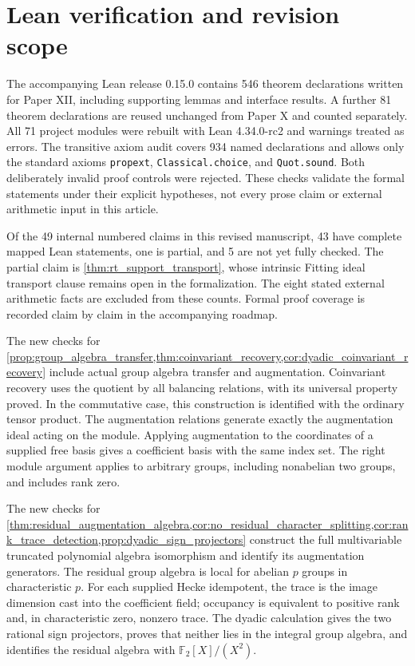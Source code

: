 \documentclass[11pt]{amsart}
\theoremstyle{definition}
\theoremstyle{remark}
\newcommand{\FF}{\mathbb F}
\begin{document}
\section*{Lean verification and revision scope}

The accompanying Lean release 0.15.0 contains 546 theorem declarations written for Paper XII, including supporting lemmas and interface results. A further 81 theorem declarations are reused unchanged from Paper X and counted separately. All 71 project modules were rebuilt with Lean 4.34.0-rc2 and warnings treated as errors. The transitive axiom audit covers 934 named declarations and allows only the standard axioms \texttt{propext}, \texttt{Classical.choice}, and \texttt{Quot.sound}. Both deliberately invalid proof controls were rejected. These checks validate the formal statements under their explicit hypotheses, not every prose claim or external arithmetic input in this article.

Of the 49 internal numbered claims in this revised manuscript, 43 have complete mapped Lean statements, one is partial, and 5 are not yet fully checked. The partial claim is \cref{thm:rt_support_transport}, whose intrinsic Fitting ideal transport clause remains open in the formalization. The eight stated external arithmetic facts are excluded from these counts. Formal proof coverage is recorded claim by claim in the accompanying roadmap.

The new checks for \cref{prop:group_algebra_transfer,thm:coinvariant_recovery,cor:dyadic_coinvariant_recovery} include actual group algebra transfer and augmentation. Coinvariant recovery uses the quotient by all balancing relations, with its universal property proved. In the commutative case, this construction is identified with the ordinary tensor product. The augmentation relations generate exactly the augmentation ideal acting on the module. Applying augmentation to the coordinates of a supplied free basis gives a coefficient basis with the same index set. The right module argument applies to arbitrary groups, including nonabelian two groups, and includes rank zero.

The new checks for \cref{thm:residual_augmentation_algebra,cor:no_residual_character_splitting,cor:rank_trace_detection,prop:dyadic_sign_projectors} construct the full multivariable truncated polynomial algebra isomorphism and identify its augmentation generators. The residual group algebra is local for abelian \(p\) groups in characteristic \(p\). For each supplied Hecke idempotent, the trace is the image dimension cast into the coefficient field; occupancy is equivalent to positive rank and, in characteristic zero, nonzero trace. The dyadic calculation gives the two rational sign projectors, proves that neither lies in the integral group algebra, and identifies the residual algebra with \(\FF_2[X]/(X^2)\).
\end{document}

